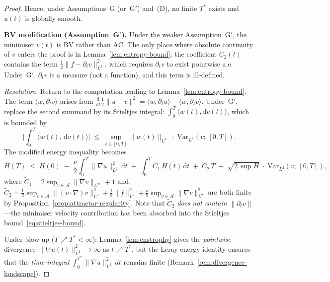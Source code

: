 \documentclass[12pt,a4paper]{article}
\theoremstyle{definition}
\theoremstyle{plain}
\theoremstyle{remark}
\begin{document}
\begin{proof}
Hence, under Assumptions~G (or~G$'$) and~(D), no finite $T^*$ exists
and $u(t)$ is globally smooth.

\medskip
\noindent\textbf{BV modification (Assumption~G$'$).}\;
Under the weaker Assumption~G$'$, the minimiser $v(t)$ is BV rather
than AC. The only place where absolute continuity of $v$ enters the
proof is in Lemma~\ref{lem:entropy-bound}: the coefficient
$C_2(t)$ contains the term $\tfrac{1}{2}\|f - \partial_t v\|_{L^2}^2$,
which requires $\partial_t v$ to exist pointwise a.e. Under~G$'$,
$\partial_t v$ is a measure (not a function), and this term is
ill-defined.

\emph{Resolution.}\;
Return to the computation leading to Lemma~\ref{lem:entropy-bound}.
The term $\langle w, \partial_t v\rangle$ arises from
$\frac{\mathrm{d}}{\mathrm{d}t}\tfrac{1}{2}\|u-v\|^2
= \langle w, \partial_t u\rangle - \langle w, \partial_t v\rangle$.
Under~G$'$, replace the second summand by its Stieltjes integral:
$\int_0^T \langle w(t), \mathrm{d}v(t)\rangle$, which is bounded by
\begin{equation}\label{eq:stieltjes-bound}
  \biggl|\int_0^T \langle w(t),\, \mathrm{d}v(t)\rangle\biggr|
  \;\le\;
  \sup_{t \in [0,T]} \|w(t)\|_{L^2}
  \;\cdot\;
  \mathrm{Var}_{L^2}(v;\, [0,T]).
\end{equation}
The modified energy inequality becomes
\begin{equation}\label{eq:H-integral-BV}
  H(T) \;\le\; H(0)
  \;-\; \frac{\nu}{2}\int_0^T \|\nabla u\|_{L^2}^2\,\mathrm{d}t
  \;+\; \int_0^T \widetilde{C}_1\,H(t)\,\mathrm{d}t
  \;+\; \widetilde{C}_2\,T
  \;+\; \sqrt{2\,\sup H}\;\cdot\;
    \mathrm{Var}_{L^2}(v;\,[0,T]),
\end{equation}
where $\widetilde{C}_1 = 2\sup_{v \in \mathcal{A}}
\|\nabla v\|_{L^\infty} + 1$ and $\widetilde{C}_2 =
\tfrac{1}{2}\sup_{v \in \mathcal{A}}\|(v\cdot\nabla)v\|_{L^2}^2
+ \tfrac{1}{2}\|f\|_{L^2}^2 + \tfrac{\nu}{2}\sup_{v \in \mathcal{A}}
\|\nabla v\|_{L^2}^2$ are both finite by
Proposition~\ref{prop:attractor-regularity}. Note that $\widetilde{C}_2$
\emph{does not contain} $\|\partial_t v\|$---the minimiser velocity
contribution has been absorbed into the
Stieltjes bound~\eqref{eq:stieltjes-bound}.

Under blow-up ($T \nearrow T^* < \infty$):
Lemma~\ref{lem:enstrophy} gives the \emph{pointwise} divergence
$\|\nabla u(t)\|_{L^2}^2 \to \infty$ as $t \nearrow T^*$, but the
Leray energy identity ensures that the \emph{time-integral}
$\int_0^{T^*}\|\nabla u\|_{L^2}^2\,dt$ remains finite
(Remark~\ref{rem:divergence-landscape}).


\end{proof}
\end{document}

